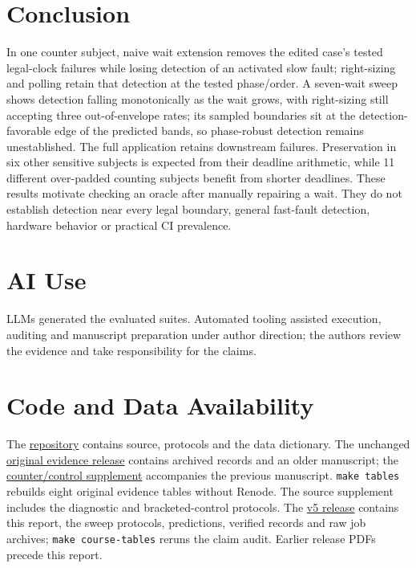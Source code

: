 \documentclass[sigconf,nonacm,balance=false]{acmart}
\begin{document}
\section{Conclusion}
In one counter subject, naive wait extension removes the edited case's tested legal-clock failures while losing detection of an activated slow fault; right-sizing and polling retain that detection at the tested phase/order. A seven-wait sweep shows detection falling monotonically as the wait grows, with right-sizing still accepting three out-of-envelope rates; its sampled boundaries sit at the detection-favorable edge of the predicted bands, so phase-robust detection remains unestablished. The full application retains downstream failures. Preservation in six other sensitive subjects is expected from their deadline arithmetic, while 11 different over-padded counting subjects benefit from shorter deadlines. These results motivate checking an oracle after manually repairing a wait. They do not establish detection near every legal boundary, general fast-fault detection, hardware behavior or practical CI prevalence.

\section*{AI Use}
LLMs generated the evaluated suites. Automated tooling assisted execution, auditing and manuscript preparation under author direction; the authors review the evidence and take responsibility for the claims.

\section*{Code and Data Availability}
The \href{https://github.com/pkrish5/zephyr-rtc-clock-robustness}{repository} contains source, protocols and the data dictionary. The unchanged \href{https://github.com/pkrish5/zephyr-rtc-clock-robustness/releases/tag/course-submission-2026-11-03-v1}{original evidence release} contains archived records and an older manuscript; the \href{https://github.com/pkrish5/zephyr-rtc-clock-robustness/releases/tag/course-paper-2026-11-12-v4}{counter/control supplement} accompanies the previous manuscript. \texttt{make tables} rebuilds eight original evidence tables without Renode. The source supplement includes the diagnostic and bracketed-control protocols. The \href{https://github.com/pkrish5/zephyr-rtc-clock-robustness/releases/tag/course-paper-2026-11-21-v5}{v5 release} contains this report, the sweep protocols, predictions, verified records and raw job archives; \texttt{make course-tables} reruns the claim audit. Earlier release PDFs precede this report.
\end{document}
